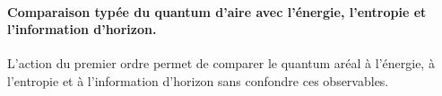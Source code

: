 \begin{HMTScientificOwnerSubordinated}

\end{HMTScientificOwnerSubordinated}

\paragraph{Comparaison typée du quantum d’aire avec l’énergie, l’entropie et l’information d’horizon.} L’action du premier ordre permet de comparer le quantum aréal à l’énergie, à l’entropie et à l’information d’horizon sans confondre ces observables.
